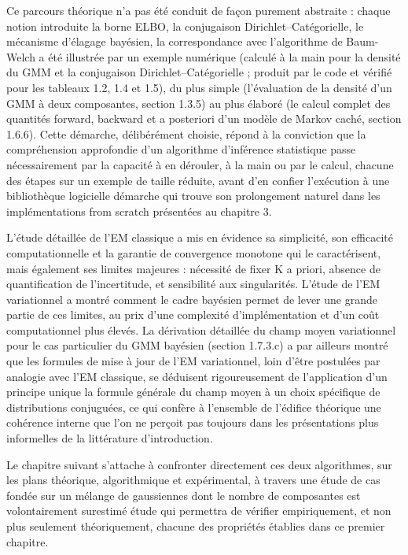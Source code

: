Ce parcours théorique n'a pas été conduit de façon purement abstraite : chaque notion introduite  la borne ELBO, la conjugaison Dirichlet--Catégorielle, le mécanisme d'élagage bayésien, la correspondance avec l'algorithme de Baum-Welch  a été illustrée par un exemple numérique (calculé à la main pour la densité du GMM et la conjugaison Dirichlet--Catégorielle ; produit par le code et vérifié pour les tableaux 1.2, 1.4 et 1.5), du plus simple (l'évaluation de la densité d'un GMM à deux composantes, section 1.3.5) au plus élaboré (le calcul complet des quantités forward, backward et a posteriori d'un modèle de Markov caché, section 1.6.6). Cette démarche, délibérément choisie, répond à la conviction que la compréhension approfondie d'un algorithme d'inférence statistique passe nécessairement par la capacité à en dérouler, à la main ou par le calcul, chacune des étapes sur un exemple de taille réduite, avant d'en confier l'exécution à une bibliothèque logicielle  démarche qui trouve son prolongement naturel dans les implémentations from scratch présentées au chapitre 3.

L'étude détaillée de l'EM classique a mis en évidence sa simplicité, son efficacité computationnelle et la garantie de convergence monotone qui le caractérisent, mais également ses limites majeures : nécessité de fixer K a priori, absence de quantification de l'incertitude, et sensibilité aux singularités. L'étude de l'EM variationnel a montré comment le cadre bayésien permet de lever une grande partie de ces limites, au prix d'une complexité d'implémentation et d'un coût computationnel plus élevés. La dérivation détaillée du champ moyen variationnel pour le cas particulier du GMM bayésien (section 1.7.3.c) a par ailleurs montré que les formules de mise à jour de l'EM variationnel, loin d'être postulées par analogie avec l'EM classique, se déduisent rigoureusement de l'application d'un principe unique  la formule générale du champ moyen  à un choix spécifique de distributions conjuguées, ce qui confère à l'ensemble de l'édifice théorique une cohérence interne que l'on ne perçoit pas toujours dans les présentations plus informelles de la littérature d'introduction.

Le chapitre suivant s'attache à confronter directement ces deux algorithmes, sur les plans théorique, algorithmique et expérimental, à travers une étude de cas fondée sur un mélange de gaussiennes dont le nombre de composantes est volontairement surestimé  étude qui permettra de vérifier empiriquement, et non plus seulement théoriquement, chacune des propriétés établies dans ce premier chapitre.



